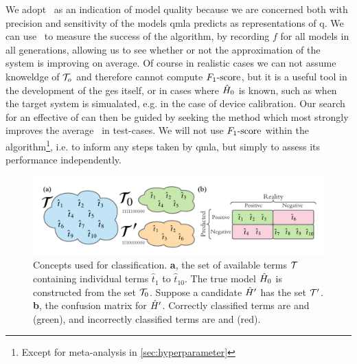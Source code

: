 We adopt \fs \ as an indication of model quality because we are concerned both with precision and sensitivity
    of the models \gls{qmla} predicts as representations of \gls{q}. 
We can use \fs \ to measure the success of the algorithm,
    by recording $f$ for all models in all generations, allowing us to 
    see whether or not the approximation of the system is improving on average. 
Of course in realistic cases we can not assume knoweldge of $\mathcal{T}_o$ and therefore cannot compute 
    $ F_{1}\text{-score} $, but it is a useful tool in the development of the \gls{ges} itself, 
    or in cases where $\hat{H}_0$ is known, such as when the target system is simualated, e.g. in the case of device calibration.
Our search for an effective \gls{of} can then be guided by seeking the 
    method which most strongly improves the average \fs \ in test-cases.
We will not use $ F_{1}\text{-score} $ within the algorithm\footnote{Except for meta-analysis in \cref{sec:hyperparameter}}, 
    i.e. to inform any steps taken by \gls{qmla}, but simply to assess its performance independently.

\begin{figure}
    \begin{center}
        \includegraphics[width=\textwidth]{theoretical_study/figures/classication_example.pdf}
    \end{center}
    \caption[Classification concepts]{
        Concepts used for classification. 
        \textbf{a}, the set of available terms $\mathcal{T}$ containing individual terms $\hat{t}_1$ to $\hat{t}_{10}$. 
        The \gls{true model} $\hat{H}_0$ is constructed from the set $\mathcal{T}_0$. 
        Suppose a candidate $\hat{H}^{\prime}$ has the set $\mathcal{T}^{\prime}$. 
        \textbf{b}, the confusion matrix for $\hat{H}^{\prime}$. Correctly classified terms are  and  (green), 
            and incorrectly classified terms are  and  (red). 
    }
    \label{fig:classification_eg}
\end{figure}



